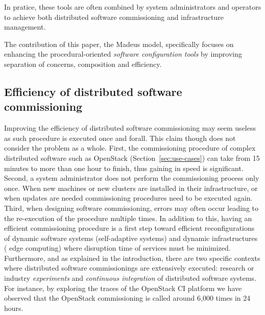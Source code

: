In pratice, these tools are often combined by system administrators
and operators to achieve both distributed software commissioning and
infrastructure management.

\begin{tcolorbox}[enhanced,attach boxed title to top left={yshift=-3mm,yshifttext=-1mm},
  colback=black!5!white,colframe=black!30,colbacktitle=black!60,
  title=Scope,fonttitle=\bfseries,
  boxed title style={size=small,colframe=black!60,boxrule=0.2mm},
  boxrule=0.2mm]
  The contribution of this paper, \ie the Madeus model, specifically
  focuses on enhancing the procedural-oriented \emph{software
    configuration tools} by improving separation of concerns,
  composition and efficiency.
\end{tcolorbox}


\subsection{Efficiency of distributed software commissioning}

Improving the efficiency of distributed software commissioning may
seem useless as such procedure is executed once and forall. This claim
though does not consider the problem as a whole.
%
First, the commissioning procedure of complex distributed software
such as OpenStack (Section~\ref{sec:use-cases}) can take from 15
minutes to more than one hour to finish, thus gaining in speed is
significant. Second, a system administrator does not perform the
commissioning process only once. When new machines or new clusters are
installed in their infrastructure, or when updates are needed
commissioning procedures need to be executed again. Third, when
designing software commissioning, errors may often occur leading to the
re-execution of the procedure multiple times.
In addition to this, having an efficient commissioning procedure is a
first step toward efficient reconfigurations of dynamic software
systems (\eg self-adaptive systems) and dynamic infrastructures (\eg
edge computing) where disruption time of services must be minimized.
Furthermore, and as explained in the introduction, there are two
specific contexts where distributed software commissionings are
extensively executed: research or industry \emph{experiments} and
\emph{continuous integration} of distributed software systems. For
instance, by exploring the traces of the OpenStack CI platform we have
observed that the OpenStack commissioning is called around 6,000 times
in 24 hours.

